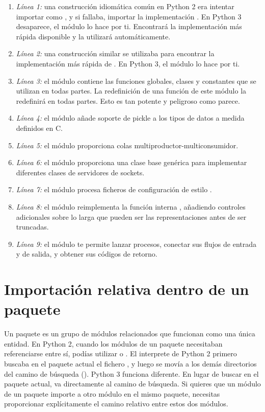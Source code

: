 \begin{enumerate}
  \item \emph{Línea 1:} una construcción idiomática común en Python 2 era intentar importar  como , y si fallaba, importar la implementación . En Python 3 desaparece, el módulo  lo hace por ti. Encontrará la implementación más rápida disponible y la utilizará automáticamente.
  \item \emph{Línea 2:} una construcción similar se utilizaba para encontrar la implementación más rápida de . En Python 3, el módulo  lo hace por ti.
  \item \emph{Línea 3:} el módulo  contiene las funciones globales, clases y constantes que se utilizan en todas partes. La redefinición de una función de este módulo la redefinirá en todas partes. Esto es tan potente y peligroso como parece.
  \item \emph{Línea 4:} el módulo  añade soporte de pickle a los tipos de datos a medida definidos en C.
  \item \emph{Línea 5:} el módulo  proporciona colas multiproductor-multiconsumidor.
  \item \emph{Línea 6:} el módulo  proporciona una clase base genérica para implementar diferentes clases de servidores de sockets.
  \item \emph{Línea 7:} el módulo  procesa ficheros de configuración de estilo .
  \item \emph{Línea 8:} el módulo  reimplementa la función interna , añadiendo controles adicionales sobre lo larga que pueden ser las representaciones antes de ser truncadas.
  \item \emph{Línea 9:} el módulo  te permite lanzar procesos, conectar sus flujos de entrada y de salida, y obtener sus códigos de retorno.
\end{enumerate}

\section{Importación relativa dentro de un paquete}

Un paquete es un grupo de módulos relacionados que funcionan como una única entidad. En Python 2, cuando los módulos de un paquete necesitaban referenciarse entre sí, podías utilizar  o . El interprete de Python 2 primero buscaba en el paquete actual el fichero , y luego se movía a los demás directorios del camino de búsqueda (). Python 3 funciona diferente. En lugar de buscar en el paquete actual, va directamente al camino de búsqueda. Si quieres que un módulo de un paquete importe a otro módulo en el mismo paquete, necesitas proporcionar explícitamente el camino relativo entre estos dos módulos.

